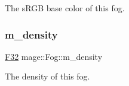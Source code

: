 The s\+R\+GB base color of this fog. \hypertarget{classmage_1_1_fog_a61e5b808bd2d800ec3a33f202e834814}{}\label{classmage_1_1_fog_a61e5b808bd2d800ec3a33f202e834814} 
\subsubsection{\texorpdfstring{m\+\_\+density}{m\_density}}
{\footnotesize\ttfamily \hyperlink{namespacemage_aa97e833b45f06d60a0a9c4fc22ae02c0}{F32} mage\+::\+Fog\+::m\+\_\+density\hspace{0.3cm}{\ttfamily [private]}}

The density of this fog. 